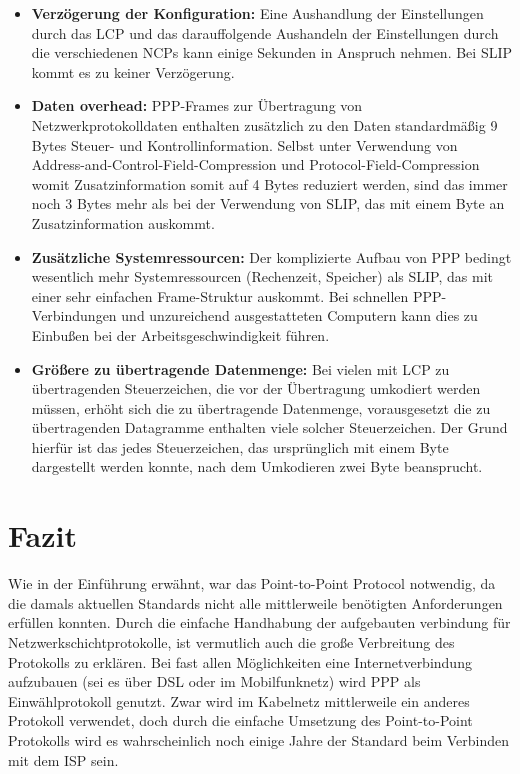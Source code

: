 \documentclass[journal,11pt]{IEEEtran}
\begin{document}
\begin{itemize}
\item \textbf{Verzögerung der Konfiguration:} Eine Aushandlung der Einstellungen durch das LCP und das darauffolgende Aushandeln der Einstellungen durch die verschiedenen NCPs kann einige Sekunden in Anspruch nehmen. Bei SLIP kommt es zu keiner Verzögerung.
\item \textbf{Daten overhead:} PPP-Frames zur Übertragung von Netzwerkprotokolldaten enthalten zusätzlich zu den Daten standardmäßig 9 Bytes Steuer- und Kontrollinformation. Selbst unter Verwendung von Address-and-Control-Field-Compression und Protocol-Field-Compression womit Zusatzinformation somit auf 4 Bytes reduziert werden, sind das immer noch 3 Bytes mehr als bei der Verwendung von SLIP, das mit einem Byte an Zusatzinformation auskommt.
\item \textbf{Zusätzliche Systemressourcen:} Der komplizierte Aufbau von PPP bedingt wesentlich mehr Systemressourcen (Rechenzeit, Speicher) als SLIP, das mit einer sehr einfachen Frame-Struktur auskommt. Bei schnellen PPP-Verbindungen und unzureichend ausgestatteten Computern kann dies zu Einbußen bei der Arbeitsgeschwindigkeit führen.
\item \textbf{Größere zu übertragende Datenmenge:} Bei vielen mit LCP zu übertragenden Steuerzeichen, die vor der Übertragung umkodiert werden müssen, erhöht sich die zu übertragende Datenmenge, vorausgesetzt die zu übertragenden Datagramme enthalten viele solcher Steuerzeichen. Der Grund hierfür ist das jedes Steuerzeichen, das ursprünglich mit einem Byte dargestellt werden konnte, nach dem Umkodieren zwei Byte beansprucht. 
\end{itemize}
%
\section{Fazit} 
Wie in der Einf\"uhrung erw\"ahnt, war das Point-to-Point Protocol notwendig, da die damals aktuellen Standards nicht alle mittlerweile ben\"otigten Anforderungen erf\"ullen konnten. Durch die einfache Handhabung der aufgebauten verbindung f\"ur Netzwerkschichtprotokolle, ist vermutlich auch die große Verbreitung des Protokolls zu erkl\"aren. Bei fast allen M\"oglichkeiten eine Internetverbindung aufzubauen (sei es \"uber DSL oder im Mobilfunknetz) wird PPP als Einw\"ahlprotokoll genutzt. Zwar wird im Kabelnetz mittlerweile ein anderes Protokoll verwendet, doch durch die einfache Umsetzung des Point-to-Point Protokolls wird es wahrscheinlich noch einige Jahre der Standard beim Verbinden mit dem ISP sein.
\end{document}
